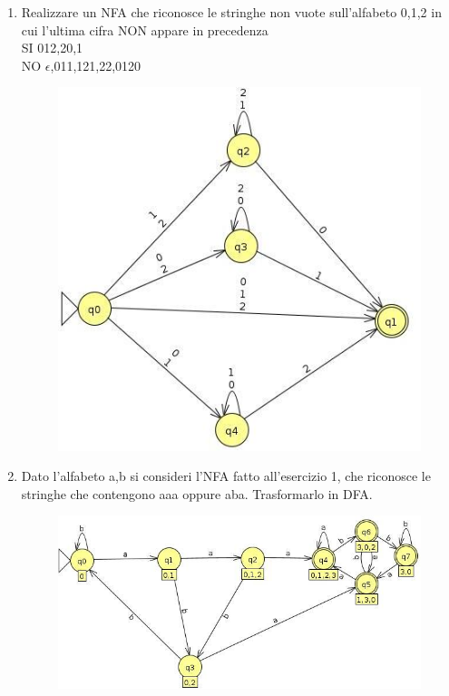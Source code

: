\begin{enumerate}
\newpage
\item Realizzare un NFA che riconosce le stringhe non vuote sull'alfabeto {0,1,2} in cui l'ultima cifra NON appare in precedenza
\\
SI 012,20,1
\\
NO $\epsilon$,011,121,22,0120

\begin{figure}[h]
  \includegraphics[scale = 0.5]{media/es10.jpg}
  \centering
\end{figure}

\item Dato l'alfabeto {a,b} si consideri l'NFA fatto all'esercizio 1, che riconosce le stringhe che contengono aaa oppure aba. Trasformarlo in DFA.

\begin{figure}[h]
  \includegraphics[scale = 0.5]{media/es11.jpg}
  \centering
\end{figure}
\end{enumerate}

